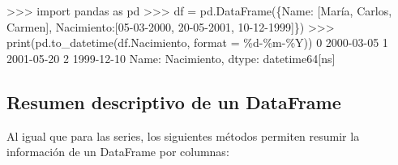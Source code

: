 \documentclass[
  spanish,
  a4paper,
]{scrreport}
\newenvironment{Shaded}{\begin{snugshade}}{\end{snugshade}}
\newcommand{\BuiltInTok}[1]{\textcolor[rgb]{0.00,0.23,0.31}{#1}}
\newcommand{\DecValTok}[1]{\textcolor[rgb]{0.68,0.00,0.00}{#1}}
\newcommand{\ErrorTok}[1]{\textcolor[rgb]{0.68,0.00,0.00}{#1}}
\newcommand{\ImportTok}[1]{\textcolor[rgb]{0.00,0.46,0.62}{#1}}
\newcommand{\NormalTok}[1]{\textcolor[rgb]{0.00,0.23,0.31}{#1}}
\newcommand{\OperatorTok}[1]{\textcolor[rgb]{0.37,0.37,0.37}{#1}}
\newcommand{\SpecialCharTok}[1]{\textcolor[rgb]{0.37,0.37,0.37}{#1}}
\newcommand{\StringTok}[1]{\textcolor[rgb]{0.13,0.47,0.30}{#1}}
\begin{document}
\begin{Shaded}
\begin{Highlighting}[]
\OperatorTok{\textgreater{}\textgreater{}\textgreater{}} \ImportTok{import}\NormalTok{ pandas }\ImportTok{as}\NormalTok{ pd}
\OperatorTok{\textgreater{}\textgreater{}\textgreater{}}\NormalTok{ df }\OperatorTok{=}\NormalTok{ pd.DataFrame(\{}\StringTok{\textquotesingle{}Name\textquotesingle{}}\NormalTok{: [}\StringTok{\textquotesingle{}María\textquotesingle{}}\NormalTok{, }\StringTok{\textquotesingle{}Carlos\textquotesingle{}}\NormalTok{, }\StringTok{\textquotesingle{}Carmen\textquotesingle{}}\NormalTok{], }\StringTok{\textquotesingle{}Nacimiento\textquotesingle{}}\NormalTok{:[}\StringTok{\textquotesingle{}05{-}03{-}2000\textquotesingle{}}\NormalTok{, }\StringTok{\textquotesingle{}20{-}05{-}2001\textquotesingle{}}\NormalTok{, }\StringTok{\textquotesingle{}10{-}12{-}1999\textquotesingle{}}\NormalTok{]\})}
\OperatorTok{\textgreater{}\textgreater{}\textgreater{}} \BuiltInTok{print}\NormalTok{(pd.to\_datetime(df.Nacimiento, }\BuiltInTok{format} \OperatorTok{=} \StringTok{\textquotesingle{}}\SpecialCharTok{\%d}\StringTok{{-}\%m{-}\%Y\textquotesingle{}}\NormalTok{))}
\DecValTok{0}   \DecValTok{2000}\OperatorTok{{-}}\DecValTok{0}\ErrorTok{3}\OperatorTok{{-}}\DecValTok{0}\ErrorTok{5}
\DecValTok{1}   \DecValTok{2001}\OperatorTok{{-}}\DecValTok{0}\ErrorTok{5}\OperatorTok{{-}}\DecValTok{20}
\DecValTok{2}   \DecValTok{1999}\OperatorTok{{-}}\DecValTok{12}\OperatorTok{{-}}\DecValTok{10}
\NormalTok{Name: Nacimiento, dtype: datetime64[ns]}
\end{Highlighting}
\end{Shaded}

\subsection{Resumen descriptivo de un
DataFrame}\label{resumen-descriptivo-de-un-dataframe}

Al igual que para las series, los siguientes métodos permiten resumir la
información de un DataFrame por columnas:
\end{document}
